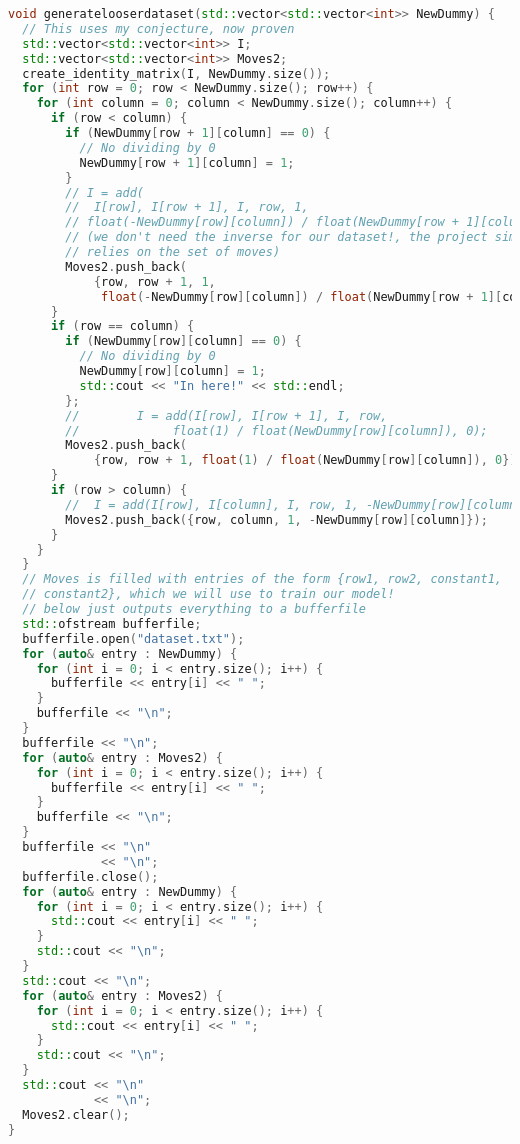 \documentclass{article}
\begin{document}
\begin{lstlisting}[language=C++]
void generatelooserdataset(std::vector<std::vector<int>> NewDummy) {
  // This uses my conjecture, now proven
  std::vector<std::vector<int>> I;
  std::vector<std::vector<int>> Moves2;
  create_identity_matrix(I, NewDummy.size());
  for (int row = 0; row < NewDummy.size(); row++) {
    for (int column = 0; column < NewDummy.size(); column++) {
      if (row < column) {
        if (NewDummy[row + 1][column] == 0) {
          // No dividing by 0
          NewDummy[row + 1][column] = 1;
        }
        // I = add(
        //  I[row], I[row + 1], I, row, 1,
        // float(-NewDummy[row][column]) / float(NewDummy[row + 1][column]));
        // (we don't need the inverse for our dataset!, the project simply
        // relies on the set of moves)
        Moves2.push_back(
            {row, row + 1, 1,
             float(-NewDummy[row][column]) / float(NewDummy[row + 1][column])});
      }
      if (row == column) {
        if (NewDummy[row][column] == 0) {
          // No dividing by 0
          NewDummy[row][column] = 1;
          std::cout << "In here!" << std::endl;
        };
        //        I = add(I[row], I[row + 1], I, row,
        //             float(1) / float(NewDummy[row][column]), 0);
        Moves2.push_back(
            {row, row + 1, float(1) / float(NewDummy[row][column]), 0});
      }
      if (row > column) {
        //  I = add(I[row], I[column], I, row, 1, -NewDummy[row][column]);
        Moves2.push_back({row, column, 1, -NewDummy[row][column]});
      }
    }
  }
  // Moves is filled with entries of the form {row1, row2, constant1,
  // constant2}, which we will use to train our model!
  // below just outputs everything to a bufferfile
  std::ofstream bufferfile;
  bufferfile.open("dataset.txt");
  for (auto& entry : NewDummy) {
    for (int i = 0; i < entry.size(); i++) {
      bufferfile << entry[i] << " ";
    }
    bufferfile << "\n";
  }
  bufferfile << "\n";
  for (auto& entry : Moves2) {
    for (int i = 0; i < entry.size(); i++) {
      bufferfile << entry[i] << " ";
    }
    bufferfile << "\n";
  }
  bufferfile << "\n"
             << "\n";
  bufferfile.close();
  for (auto& entry : NewDummy) {
    for (int i = 0; i < entry.size(); i++) {
      std::cout << entry[i] << " ";
    }
    std::cout << "\n";
  }
  std::cout << "\n";
  for (auto& entry : Moves2) {
    for (int i = 0; i < entry.size(); i++) {
      std::cout << entry[i] << " ";
    }
    std::cout << "\n";
  }
  std::cout << "\n"
            << "\n";
  Moves2.clear();
}


\end{lstlisting}
\end{document}

